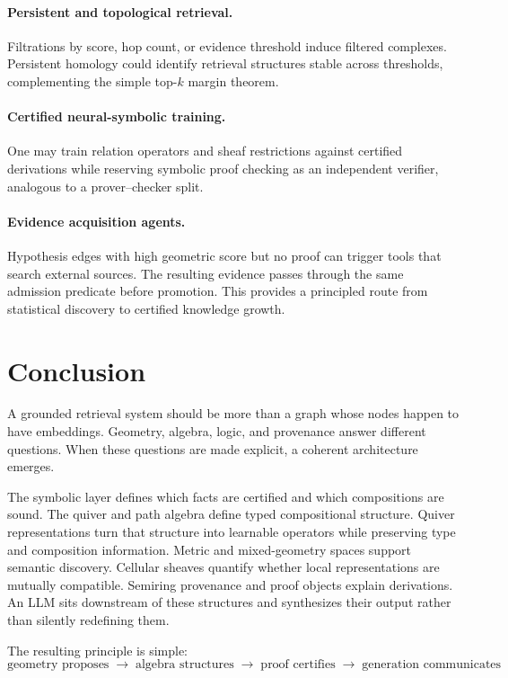 \documentclass[11pt]{article}
\begin{document}
\paragraph{Persistent and topological retrieval.}
Filtrations by score, hop count, or evidence threshold induce filtered complexes. Persistent homology could identify retrieval structures stable across thresholds, complementing the simple top-$k$ margin theorem.

\paragraph{Certified neural-symbolic training.}
One may train relation operators and sheaf restrictions against certified derivations while reserving symbolic proof checking as an independent verifier, analogous to a prover--checker split.

\paragraph{Evidence acquisition agents.}
Hypothesis edges with high geometric score but no proof can trigger tools that search external sources. The resulting evidence passes through the same admission predicate before promotion. This provides a principled route from statistical discovery to certified knowledge growth.

\section{Conclusion}

A grounded retrieval system should be more than a graph whose nodes happen to have embeddings. Geometry, algebra, logic, and provenance answer different questions. When these questions are made explicit, a coherent architecture emerges.

The symbolic layer defines which facts are certified and which compositions are sound. The quiver and path algebra define typed compositional structure. Quiver representations turn that structure into learnable operators while preserving type and composition information. Metric and mixed-geometry spaces support semantic discovery. Cellular sheaves quantify whether local representations are mutually compatible. Semiring provenance and proof objects explain derivations. An LLM sits downstream of these structures and synthesizes their output rather than silently redefining them.

The resulting principle is simple:
\[
\boxed{
\text{geometry proposes}
\;\longrightarrow\;
\text{algebra structures}
\;\longrightarrow\;
\text{proof certifies}
\;\longrightarrow\;
\text{generation communicates}
}
\]
\end{document}
